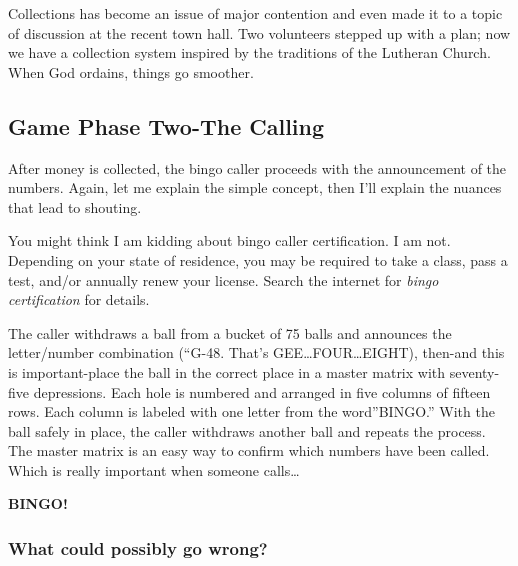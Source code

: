 \documentclass[
  letterpaper,
  DIV=11,
  numbers=noendperiod]{scrartcl}
\begin{document}
Collections has become an issue of major contention and even made it to
a topic of discussion at the recent town hall. Two volunteers stepped up
with a plan; now we have a collection system inspired by the traditions
of the Lutheran Church. When God ordains, things go smoother.

\hypertarget{game-phase-two-the-calling}{%
\subsection{Game Phase Two-The
Calling}\label{game-phase-two-the-calling}}

After money is collected, the bingo caller proceeds with the
announcement of the numbers. Again, let me explain the simple concept,
then I'll explain the nuances that lead to shouting.

\begin{tcolorbox}[enhanced jigsaw, bottomrule=.15mm, title={Bingo Caller Certification}, colbacktitle=quarto-callout-note-color!10!white, left=2mm, leftrule=.75mm, coltitle=black, arc=.35mm, breakable, rightrule=.15mm, opacityback=0, bottomtitle=1mm, colframe=quarto-callout-note-color-frame, toprule=.15mm, toptitle=1mm, titlerule=0mm, opacitybacktitle=0.6, colback=white]
You might think I am kidding about bingo caller certification. I am not.
Depending on your state of residence, you may be required to take a
class, pass a test, and/or annually renew your license. Search the
internet for \emph{bingo certification} for details.
\end{tcolorbox}

The caller withdraws a ball from a bucket of 75 balls and announces the
letter/number combination (``G-48. That's GEE\ldots FOUR\ldots EIGHT),
then-and this is important-place the ball in the correct place in a
master matrix with seventy-five depressions. Each hole is numbered and
arranged in five columns of fifteen rows. Each column is labeled with
one letter from the word''BINGO.'' With the ball safely in place, the
caller withdraws another ball and repeats the process. The master matrix
is an easy way to confirm which numbers have been called. Which is
really important when someone calls\ldots{}

\textbf{BINGO!}

\hypertarget{what-could-possibly-go-wrong}{%
\subsubsection{What could possibly go
wrong?}\label{what-could-possibly-go-wrong}}
\end{document}
